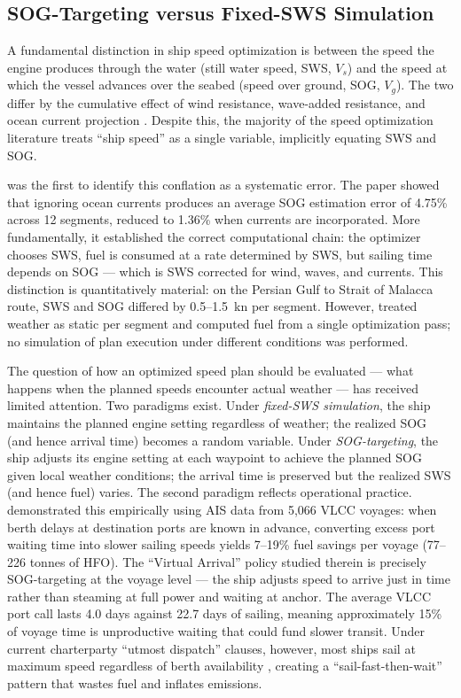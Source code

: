 \documentclass[review,authoryear]{elsarticle}  %
\begin{document}
\subsection{SOG-Targeting versus Fixed-SWS Simulation}
\label{sec:lit-sog}

A fundamental distinction in ship speed optimization is between the speed the engine produces through the water (still water speed, SWS, $V_s$) and the speed at which the vessel advances over the seabed (speed over ground, SOG, $V_g$). The two differ by the cumulative effect of wind resistance, wave-added resistance, and ocean current projection \citet{Yang2020}. Despite this, the majority of the speed optimization literature treats ``ship speed'' as a single variable, implicitly equating SWS and SOG.

\citet{Yang2020} was the first to identify this conflation as a systematic error. The paper showed that ignoring ocean currents produces an average SOG estimation error of 4.75\% across 12 segments, reduced to 1.36\% when currents are incorporated. More fundamentally, it established the correct computational chain: the optimizer chooses SWS, fuel is consumed at a rate determined by SWS, but sailing time depends on SOG --- which is SWS corrected for wind, waves, and currents. This distinction is quantitatively material: on the Persian Gulf to Strait of Malacca route, SWS and SOG differed by 0.5--1.5~kn per segment. However, \citet{Yang2020} treated weather as static per segment and computed fuel from a single optimization pass; no simulation of plan execution under different conditions was performed.

The question of how an optimized speed plan should be evaluated --- what happens when the planned speeds encounter actual weather --- has received limited attention. Two paradigms exist. Under \emph{fixed-SWS simulation}, the ship maintains the planned engine setting regardless of weather; the realized SOG (and hence arrival time) becomes a random variable. Under \emph{SOG-targeting}, the ship adjusts its engine setting at each waypoint to achieve the planned SOG given local weather conditions; the arrival time is preserved but the realized SWS (and hence fuel) varies. The second paradigm reflects operational practice. \citet{Jia2017} demonstrated this empirically using AIS data from 5,066 VLCC voyages: when berth delays at destination ports are known in advance, converting excess port waiting time into slower sailing speeds yields 7--19\% fuel savings per voyage (77--226 tonnes of HFO). The ``Virtual Arrival'' policy studied therein is precisely SOG-targeting at the voyage level --- the ship adjusts speed to arrive just in time rather than steaming at full power and waiting at anchor. The average VLCC port call lasts 4.0 days against 22.7 days of sailing, meaning approximately 15\% of voyage time is unproductive waiting that could fund slower transit. Under current charterparty ``utmost dispatch'' clauses, however, most ships sail at maximum speed regardless of berth availability \citet{Jia2017}, creating a ``sail-fast-then-wait'' pattern that wastes fuel and inflates emissions.
\end{document}

